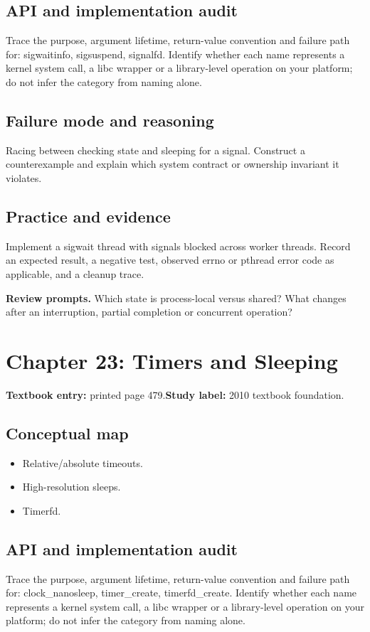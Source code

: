 \documentclass[11pt,letterpaper,oneside]{report}
\begin{document}
\subsection{API and implementation audit}
Trace the purpose, argument lifetime, return-value convention and failure path for: sigwaitinfo, sigsuspend, signalfd. Identify whether each name represents a kernel system call, a libc wrapper or a library-level operation on your platform; do not infer the category from naming alone.

\subsection{Failure mode and reasoning}
Racing between checking state and sleeping for a signal. Construct a counterexample and explain which system contract or ownership invariant it violates.

\subsection{Practice and evidence}
Implement a sigwait thread with signals blocked across worker threads. Record an expected result, a negative test, observed errno or pthread error code as applicable, and a cleanup trace.

\textbf{Review prompts.} Which state is process-local versus shared? What changes after an interruption, partial completion or concurrent operation?

\section{Chapter 23: Timers and Sleeping}
\textbf{Textbook entry:} printed page 479.\quad \textbf{Study label:} 2010 textbook foundation.

\subsection{Conceptual map}
\begin{itemize}
\item Relative/absolute timeouts.
\item High-resolution sleeps.
\item Timerfd.
\end{itemize}
\subsection{API and implementation audit}
Trace the purpose, argument lifetime, return-value convention and failure path for: clock\_nanosleep, timer\_create, timerfd\_create. Identify whether each name represents a kernel system call, a libc wrapper or a library-level operation on your platform; do not infer the category from naming alone.
\end{document}

